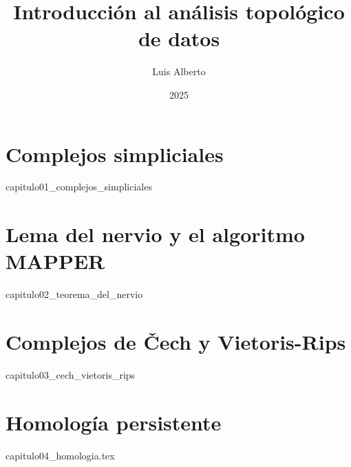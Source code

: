 \documentclass[12pt,oneside]{book}
\theoremstyle{definition}
\begin{document}
\author{Luis Alberto}
\title{Introducción al análisis topológico de datos}
\date{2025}

\frontmatter
\maketitle
\tableofcontents

\mainmatter
\chapter{Complejos simpliciales}
\label{ch:simplicial_complexes}
{capitulo01_complejos_simpliciales}

\chapter{Lema del nervio y el algoritmo MAPPER}
\label{ch:nerve_thm}
{capitulo02_teorema_del_nervio}

\chapter{Complejos de \v{C}ech y Vietoris-Rips}
\label{ch:cech_vr}
{capitulo03_cech_vietoris_rips}

\chapter{Homología persistente}
\label{ch:persitent}
{capitulo04_homologia.tex}

\backmatter


\end{document}
